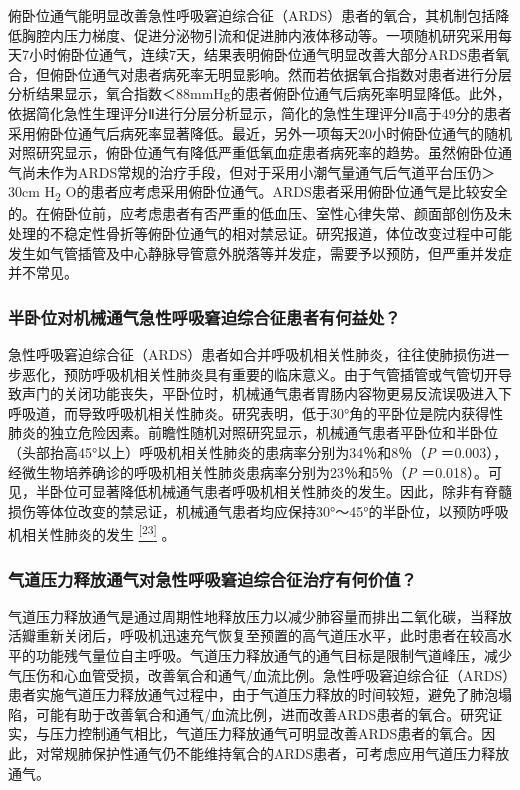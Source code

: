 俯卧位通气能明显改善急性呼吸窘迫综合征（ARDS）患者的氧合，其机制包括降低胸腔内压力梯度、促进分泌物引流和促进肺内液体移动等。一项随机研究采用每天7小时俯卧位通气，连续7天，结果表明俯卧位通气明显改善大部分ARDS患者氧合，但俯卧位通气对患者病死率无明显影响。然而若依据氧合指数对患者进行分层分析结果显示，氧合指数＜88mmHg的患者俯卧位通气后病死率明显降低。此外，依据简化急性生理评分Ⅱ进行分层分析显示，简化的急性生理评分Ⅱ高于49分的患者采用俯卧位通气后病死率显著降低。最近，另外一项每天20小时俯卧位通气的随机对照研究显示，俯卧位通气有降低严重低氧血症患者病死率的趋势。虽然俯卧位通气尚未作为ARDS常规的治疗手段，但对于采用小潮气量通气后气道平台压仍＞30cm
H\textsubscript{2}
O的患者应考虑采用俯卧位通气。ARDS患者采用俯卧位通气是比较安全的。在俯卧位前，应考虑患者有否严重的低血压、室性心律失常、颜面部创伤及未处理的不稳定性骨折等俯卧位通气的相对禁忌证。研究报道，体位改变过程中可能发生如气管插管及中心静脉导管意外脱落等并发症，需要予以预防，但严重并发症并不常见。

\subsubsection{半卧位对机械通气急性呼吸窘迫综合征患者有何益处？}

急性呼吸窘迫综合征（ARDS）患者如合并呼吸机相关性肺炎，往往使肺损伤进一步恶化，预防呼吸机相关性肺炎具有重要的临床意义。由于气管插管或气管切开导致声门的关闭功能丧失，平卧位时，机械通气患者胃肠内容物更易反流误吸进入下呼吸道，而导致呼吸机相关性肺炎。研究表明，低于30°角的平卧位是院内获得性肺炎的独立危险因素。前瞻性随机对照研究显示，机械通气患者平卧位和半卧位（头部抬高45°以上）呼吸机相关性肺炎的患病率分别为34％和8％（\emph{P}
＝0.003），经微生物培养确诊的呼吸机相关性肺炎患病率分别为23％和5％（\emph{P}
＝0.018）。可见，半卧位可显著降低机械通气患者呼吸机相关性肺炎的发生。因此，除非有脊髓损伤等体位改变的禁忌证，机械通气患者均应保持30°～45°的半卧位，以预防呼吸机相关性肺炎的发生
\protect\hyperlink{text00011.htmlux5cux23ch23-10}{\textsuperscript{{[}23{]}}}
。

\subsubsection{气道压力释放通气对急性呼吸窘迫综合征治疗有何价值？}

气道压力释放通气是通过周期性地释放压力以减少肺容量而排出二氧化碳，当释放活瓣重新关闭后，呼吸机迅速充气恢复至预置的高气道压水平，此时患者在较高水平的功能残气量位自主呼吸。气道压力释放通气的通气目标是限制气道峰压，减少气压伤和心血管受损，改善氧合和通气/血流比例。急性呼吸窘迫综合征（ARDS）患者实施气道压力释放通气过程中，由于气道压力释放的时间较短，避免了肺泡塌陷，可能有助于改善氧合和通气/血流比例，进而改善ARDS患者的氧合。研究证实，与压力控制通气相比，气道压力释放通气可明显改善ARDS患者的氧合。因此，对常规肺保护性通气仍不能维持氧合的ARDS患者，可考虑应用气道压力释放通气。

